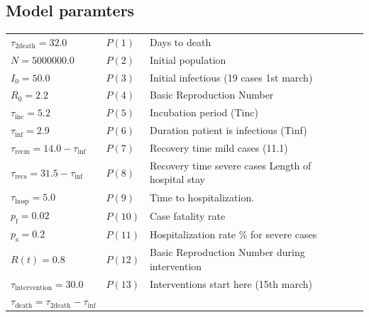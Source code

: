 \documentclass[twoside,11pt]{article}
\newcommand{\Tinc}  {\tau_\textrm{inc}}
\newcommand{\Tinf}  {\tau_\textrm{inf}}
\newcommand{\Tdeath}{\tau_\textrm{death}}
\newcommand{\Trecm} {\tau_\textrm{recm}}
\newcommand{\Trecs} {\tau_\textrm{recs}}
\newcommand{\Thosp} {\tau_\textrm{hosp}}
\newcommand{\Tint}  {\tau_\textrm{intervention}}
\newcommand{\Ttd}   {\tau_\textrm{2death}}
\newcommand{\rmf}{\mathrm{f}}
\newcommand{\rms}{\mathrm{s}}
\begin{document}
%
\subsection{Model paramters}
\begin{center}
\small
\begin{tabular}{llll}
\hline
$\Ttd   = 32.0                $&  $P(1 )$    &  Days to death                                       \\
$N      = 5000000.0           $&  $P(2 )$    &  Initial population                                  \\
$I_0    = 50.0                $&  $P(3 )$    &  Initial infectious (19 cases 1st march)             \\
$R_0    = 2.2                 $&  $P(4 )$    &  Basic Reproduction Number                           \\
$\Tinc  = 5.2                 $&  $P(5 )$    &  Incubation period (Tinc)                            \\
$\Tinf  = 2.9                 $&  $P(6 )$    &  Duration patient is infectious (Tinf)               \\
$\Trecm = 14.0 - \Tinf        $&  $P(7 )$    &  Recovery time mild cases (11.1)                     \\
$\Trecs = 31.5 - \Tinf        $&  $P(8 )$    &  Recovery time severe cases Length of hospital stay  \\
$\Thosp = 5.0                 $&  $P(9 )$    &  Time to hospitalization.                            \\
$p_\rmf = 0.02                $&  $P(10)$    &  Case fatality rate                                  \\
$p_\rms = 0.2                 $&  $P(11)$    &  Hospitalization rate \% for severe cases            \\
$R(t)   = 0.8                 $&  $P(12)$    &  Basic Reproduction Number during intervention       \\
$\Tint  = 30.0                $&  $P(13)$    &  Interventions start here (15th march)               \\
$\Tdeath  = \Ttd   - \Tinf    $&             &                                                      \\
\hline
\end{tabular}
\end{center}
%
%
\end{document}
